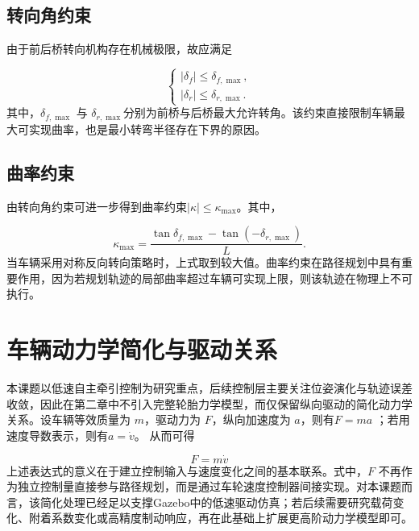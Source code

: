 \subsection{转向角约束}

由于前后桥转向机构存在机械极限，故应满足

\begin{equation}
\begin{cases}
|\delta_f|\leq \delta_{f,\max},\\
|\delta_r|\leq \delta_{r,\max}.
\end{cases}
\label{eq:steering_limits}
\end{equation}
其中，\(\delta_{f,\max}\) 与
\(\delta_{r,\max}\)分别为前桥与后桥最大允许转角。该约束直接限制车辆最大可实现曲率，也是最小转弯半径存在下界的原因。

\subsection{曲率约束}

由转向角约束可进一步得到曲率约束\(|\kappa| \leq \kappa_{\max}\)。其中，

\begin{equation}
\kappa_{\max}=\frac{\tan\delta_{f,\max}-\tan(-\delta_{r,\max})}{L}.
\label{eq:kappa_max}
\end{equation}
当车辆采用对称反向转向策略时，上式取到较大值。曲率约束在路径规划中具有重要作用，因为若规划轨迹的局部曲率超过车辆可实现上限，则该轨迹在物理上不可执行\cite{ref20,ref21,ref28}。

\section{车辆动力学简化与驱动关系}

本课题以低速自主牵引控制为研究重点，后续控制层主要关注位姿演化与轨迹误差收敛，因此在第二章中不引入完整轮胎力学模型，而仅保留纵向驱动的简化动力学关系\cite{ref19}。设车辆等效质量为
\(m\)，驱动力为 \(F\)，纵向加速度为 \(a\)，则有\(F = ma\)
；若用速度导数表示，则有\(a = \dot{v}\)。\(
\) 从而可得

\begin{equation}
F = m\dot{v}
\label{eq:10}
\end{equation}
上述表达式的意义在于建立控制输入与速度变化之间的基本联系。式中，\(F\)
不再作为独立控制量直接参与路径规划，而是通过车轮速度控制器间接实现。对本课题而言，该简化处理已经足以支撑Gazebo中的低速驱动仿真；若后续需要研究载荷变化、附着系数变化或高精度制动响应，再在此基础上扩展更高阶动力学模型即可。

